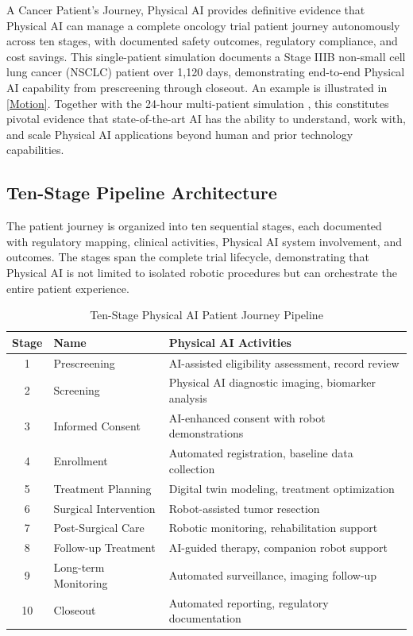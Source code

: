 
A Cancer Patient's Journey, Physical AI \cite{patient-journey-paper} provides
definitive evidence that Physical AI can manage a complete oncology trial
patient journey autonomously across ten stages, with documented safety
outcomes, regulatory compliance, and cost savings. This single-patient
simulation documents a Stage IIIB non-small cell lung cancer (NSCLC) patient
over 1,120 days, demonstrating end-to-end Physical AI capability from
prescreening through closeout. An example is illustrated in \autoref{Motion}. Together with the 24-hour multi-patient
simulation \cite{site-docs}, this constitutes pivotal evidence that
state-of-the-art AI has the ability to understand, work with, and scale
Physical AI applications beyond human and prior technology capabilities.

\subsection{Ten-Stage Pipeline Architecture}
\label{subsec:journey-pipeline}

The patient journey is organized into ten sequential stages, each documented
with regulatory mapping, clinical activities, Physical AI system involvement,
and outcomes. The stages span the complete trial lifecycle, demonstrating that
Physical AI is not limited to isolated robotic procedures but can orchestrate
the entire patient experience.

\begin{table}[H]
\centering
\caption{Ten-Stage Physical AI Patient Journey Pipeline}
\label{tab:journey-stages}
\small
\begin{tabularx}{\textwidth}{c l X}
\toprule
\textbf{Stage} & \textbf{Name} & \textbf{Physical AI Activities} \\
\midrule
1 & Prescreening & AI-assisted eligibility assessment, record review \\
2 & Screening & Physical AI diagnostic imaging, biomarker analysis \\
3 & Informed Consent & AI-enhanced consent with robot demonstrations \\
4 & Enrollment & Automated registration, baseline data collection \\
5 & Treatment Planning & Digital twin modeling, treatment optimization \\
6 & Surgical Intervention & Robot-assisted tumor resection \\
7 & Post-Surgical Care & Robotic monitoring, rehabilitation support \\
8 & Follow-up Treatment & AI-guided therapy, companion robot support \\
9 & Long-term Monitoring & Automated surveillance, imaging follow-up \\
10 & Closeout & Automated reporting, regulatory documentation \\
\bottomrule
\end{tabularx}
\end{table}

